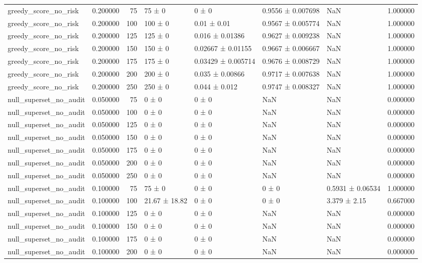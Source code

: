 \begin{tabular}{lrrllllr}
greedy_score_no_risk & 0.200000 & 75 & 75 ± 0 & 0 ± 0 & 0.9556 ± 0.007698 & NaN & 1.000000 \\
greedy_score_no_risk & 0.200000 & 100 & 100 ± 0 & 0.01 ± 0.01 & 0.9567 ± 0.005774 & NaN & 1.000000 \\
greedy_score_no_risk & 0.200000 & 125 & 125 ± 0 & 0.016 ± 0.01386 & 0.9627 ± 0.009238 & NaN & 1.000000 \\
greedy_score_no_risk & 0.200000 & 150 & 150 ± 0 & 0.02667 ± 0.01155 & 0.9667 ± 0.006667 & NaN & 1.000000 \\
greedy_score_no_risk & 0.200000 & 175 & 175 ± 0 & 0.03429 ± 0.005714 & 0.9676 ± 0.008729 & NaN & 1.000000 \\
greedy_score_no_risk & 0.200000 & 200 & 200 ± 0 & 0.035 ± 0.00866 & 0.9717 ± 0.007638 & NaN & 1.000000 \\
greedy_score_no_risk & 0.200000 & 250 & 250 ± 0 & 0.044 ± 0.012 & 0.9747 ± 0.008327 & NaN & 1.000000 \\
null_superset_no_audit & 0.050000 & 75 & 0 ± 0 & 0 ± 0 & NaN & NaN & 0.000000 \\
null_superset_no_audit & 0.050000 & 100 & 0 ± 0 & 0 ± 0 & NaN & NaN & 0.000000 \\
null_superset_no_audit & 0.050000 & 125 & 0 ± 0 & 0 ± 0 & NaN & NaN & 0.000000 \\
null_superset_no_audit & 0.050000 & 150 & 0 ± 0 & 0 ± 0 & NaN & NaN & 0.000000 \\
null_superset_no_audit & 0.050000 & 175 & 0 ± 0 & 0 ± 0 & NaN & NaN & 0.000000 \\
null_superset_no_audit & 0.050000 & 200 & 0 ± 0 & 0 ± 0 & NaN & NaN & 0.000000 \\
null_superset_no_audit & 0.050000 & 250 & 0 ± 0 & 0 ± 0 & NaN & NaN & 0.000000 \\
null_superset_no_audit & 0.100000 & 75 & 75 ± 0 & 0 ± 0 & 0 ± 0 & 0.5931 ± 0.06534 & 1.000000 \\
null_superset_no_audit & 0.100000 & 100 & 21.67 ± 18.82 & 0 ± 0 & 0 ± 0 & 3.379 ± 2.15 & 0.667000 \\
null_superset_no_audit & 0.100000 & 125 & 0 ± 0 & 0 ± 0 & NaN & NaN & 0.000000 \\
null_superset_no_audit & 0.100000 & 150 & 0 ± 0 & 0 ± 0 & NaN & NaN & 0.000000 \\
null_superset_no_audit & 0.100000 & 175 & 0 ± 0 & 0 ± 0 & NaN & NaN & 0.000000 \\
null_superset_no_audit & 0.100000 & 200 & 0 ± 0 & 0 ± 0 & NaN & NaN & 0.000000 \\

\end{tabular}

